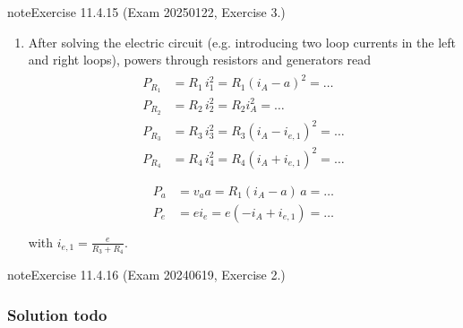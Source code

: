 \documentclass[letterpaper,10pt,english]{jupyterBook}
\begin{document}
\begin{sphinxadmonition}{note}{Exercise 11.4.15 (Exam 2025\sphinxhyphen{}01\sphinxhyphen{}22, Exercise 3.)}
\begin{enumerate}
\item {} 
\sphinxAtStartPar
After solving the electric circuit (e.g. introducing two loop currents in the left and right loops), powers through resistors and generators read
\begin{equation*}
\begin{split}\begin{aligned}
      P_{R_1} & = R_1 \, i_1^2 = R_1 (i_A - a)^2 = \dots \\
      P_{R_2} & = R_2 \, i_2^2 = R_2 i_A^2 = \dots \\
      P_{R_3} & = R_3 \, i_3^2 = R_3 (i_A - i_{e,1})^2 = \dots \\
      P_{R_4} & = R_4 \, i_4^2 = R_4 (i_A + i_{e,1})^2 = \dots \\
   \end{aligned}\end{split}
\end{equation*}\begin{equation*}
\begin{split}\begin{aligned}
      P_a & = v_a a = R_1 (i_A-a) \, a = \dots \\
      P_e & = e i_e = e ( -i_A + i_{e,1} ) = \dots \\
   \end{aligned}\end{split}
\end{equation*}
\sphinxAtStartPar
with \(i_{e,1} = \frac{e}{R_3 + R_4}\).

\end{enumerate}
\end{sphinxadmonition}
 \label{exercise:exam-24-06-19-exe-02}

\begin{sphinxadmonition}{note}{Exercise 11.4.16 (Exam 2024\sphinxhyphen{}06\sphinxhyphen{}19, Exercise 2.)}



\begin{figure}[htbp]
\centering

\noindent{}
\end{figure}
\subsubsection*{Solution \sphinxhyphen{} todo}
\end{sphinxadmonition}
 \label{exercise:exam-24-02-13-exe-01-a}
\end{document}
